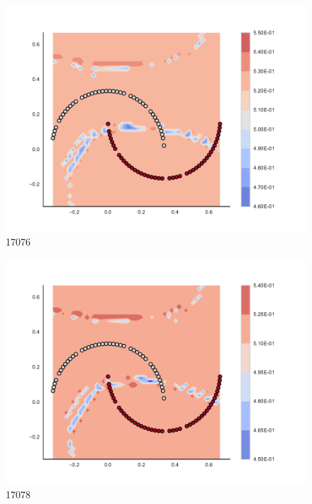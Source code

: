 \begin{subfigure}[b]{0.09\textwidth}
    \includegraphics[clip, trim=2.35cm 1.75cm 4.5cm 0cm,width=\textwidth]{img/convergence/17076.pdf}
    \caption{17076}
    \label{fig:convergence_17076}
\end{subfigure}
%
\begin{subfigure}[b]{0.09\textwidth}
    \includegraphics[clip, trim=2.35cm 1.75cm 4.5cm 0cm,width=\textwidth]{img/convergence/17078.pdf}
    \caption{17078}
    \label{fig:convergence_17078}
\end{subfigure}
%
